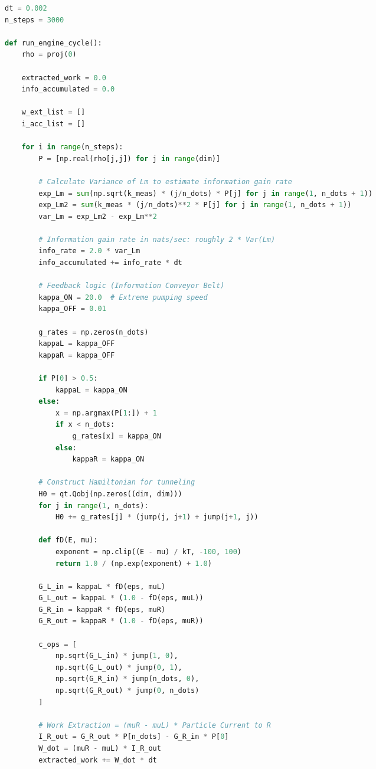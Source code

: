 \documentclass[a4paper,11pt,twocolumn]{article}
\begin{document}
\begin{CJK*}{UTF8}{min}
\begin{lstlisting}[language=Python]
dt = 0.002
n_steps = 3000

def run_engine_cycle():
    rho = proj(0)
    
    extracted_work = 0.0
    info_accumulated = 0.0
    
    w_ext_list = []
    i_acc_list = []
    
    for i in range(n_steps):
        P = [np.real(rho[j,j]) for j in range(dim)]
        
        # Calculate Variance of Lm to estimate information gain rate
        exp_Lm = sum(np.sqrt(k_meas) * (j/n_dots) * P[j] for j in range(1, n_dots + 1))
        exp_Lm2 = sum(k_meas * (j/n_dots)**2 * P[j] for j in range(1, n_dots + 1))
        var_Lm = exp_Lm2 - exp_Lm**2
        
        # Information gain rate in nats/sec: roughly 2 * Var(Lm)
        info_rate = 2.0 * var_Lm
        info_accumulated += info_rate * dt
        
        # Feedback logic (Information Conveyor Belt)
        kappa_ON = 20.0  # Extreme pumping speed
        kappa_OFF = 0.01
        
        g_rates = np.zeros(n_dots)
        kappaL = kappa_OFF
        kappaR = kappa_OFF
        
        if P[0] > 0.5:
            kappaL = kappa_ON
        else:
            x = np.argmax(P[1:]) + 1
            if x < n_dots:
                g_rates[x] = kappa_ON
            else:
                kappaR = kappa_ON
                
        # Construct Hamiltonian for tunneling
        H0 = qt.Qobj(np.zeros((dim, dim)))
        for j in range(1, n_dots):
            H0 += g_rates[j] * (jump(j, j+1) + jump(j+1, j))
            
        def fD(E, mu):
            exponent = np.clip((E - mu) / kT, -100, 100)
            return 1.0 / (np.exp(exponent) + 1.0)
            
        G_L_in = kappaL * fD(eps, muL)
        G_L_out = kappaL * (1.0 - fD(eps, muL))
        G_R_in = kappaR * fD(eps, muR)
        G_R_out = kappaR * (1.0 - fD(eps, muR))
        
        c_ops = [
            np.sqrt(G_L_in) * jump(1, 0),
            np.sqrt(G_L_out) * jump(0, 1),
            np.sqrt(G_R_in) * jump(n_dots, 0),
            np.sqrt(G_R_out) * jump(0, n_dots)
        ]
        
        # Work Extraction = (muR - muL) * Particle Current to R
        I_R_out = G_R_out * P[n_dots] - G_R_in * P[0] 
        W_dot = (muR - muL) * I_R_out
        extracted_work += W_dot * dt
        

\end{lstlisting}
\end{CJK*}
\end{document}
